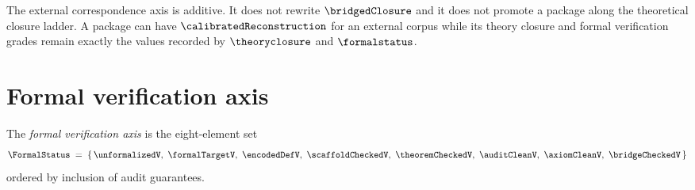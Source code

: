 \begin{remark}
\label{rem:external-correspondence-not-bridged-closure}
The external correspondence axis is additive. It does not rewrite $\bridgedClosure$ and it does not promote a package along the theoretical closure ladder. A package can have $\calibratedReconstruction$ for an external corpus while its theory closure and formal verification grades remain exactly the values recorded by $\theoryclosure$ and $\formalstatus$.
\end{remark}

\section{Formal verification axis}
\label{sec:verification-axis}

\begin{definition}
\label{def:formal-status-grades}
The \emph{formal verification axis} is the eight-element set
$$
  \FormalStatus \;=\; \{\, \unformalizedV,\ \formalTargetV,\ \encodedDefV,\ \scaffoldCheckedV,\ \theoremCheckedV,\ \auditCleanV,\ \axiomCleanV,\ \bridgeCheckedV \,\}
$$
ordered by inclusion of audit guarantees.
\end{definition}

